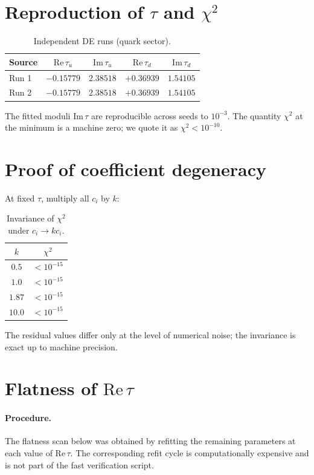 \documentclass[12pt,a4paper]{article}
\numberwithin{equation}{section}
\begin{document}
\section{Reproduction of \(\tau\) and \(\chi^2\)}
\begin{table}[H]
\centering
\caption{Independent DE runs (quark sector).}
\begin{tabular}{lcccc}
\toprule
Source & \(\mathrm{Re}\,\tau_u\) & \(\mathrm{Im}\,\tau_u\) & \(\mathrm{Re}\,\tau_d\) & \(\mathrm{Im}\,\tau_d\) \\
\midrule
Run 1 & \(-0.15779\) & \(2.38518\) & \(+0.36939\) & \(1.54105\) \\
Run 2 & \(-0.15779\) & \(2.38518\) & \(+0.36939\) & \(1.54105\) \\
\bottomrule
\end{tabular}
\end{table}
The fitted moduli \(\mathrm{Im}\,\tau\) are reproducible across seeds to \(10^{-3}\). The quantity \(\chi^2\) at the minimum is a machine zero; we quote it as \(\chi^2 < 10^{-10}\).

\section{Proof of coefficient degeneracy}
At fixed \(\tau\), multiply all \(c_i\) by \(k\):
\begin{table}[H]
\centering
\caption{Invariance of \(\chi^2\) under \(c_i \to k c_i\).}
\begin{tabular}{cc}
\toprule
\(k\) & \(\chi^2\) \\
\midrule
\(0.5\)  & \(<10^{-15}\) \\
\(1.0\)  & \(<10^{-15}\) \\
\(1.87\) & \(<10^{-15}\) \\
\(10.0\) & \(<10^{-15}\) \\
\bottomrule
\end{tabular}
\end{table}
The residual values differ only at the level of numerical noise; the invariance is exact up to machine precision.

\section{Flatness of \(\mathrm{Re}\,\tau\)}
\paragraph{Procedure.}
The flatness scan below was obtained by refitting the remaining parameters at each value of \(\mathrm{Re}\,\tau\). The corresponding refit cycle is computationally expensive and is not part of the fast verification script.
\end{document}
